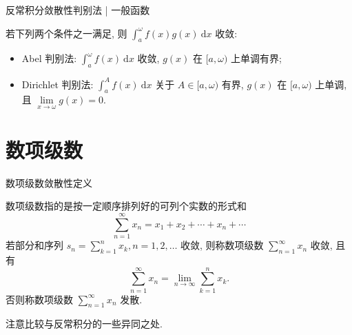 
\begin{frame}{反常积分敛散性判别法 | {\smaller[1] 一般函数}}

\begin{thm}[A-D 判别法]
若下列两个条件之一满足, 则 $\int_a^\omega f(x)g(x) ~ \mathrm{d} x$ 收敛:
\pause
\begin{itemize}[<+->]
\item Abel 判别法: $\int_a^\omega f(x) ~ \mathrm{d} x$ 收敛, $g(x)$ 在 $[a, \omega)$ 上单调有界;
\item Dirichlet 判别法: $\int_a^A f(x) ~ \mathrm{d} x$ 关于 $A \in [a, \omega)$ 有界, $g(x)$ 在 $[a, \omega)$ 上单调, 且 $\lim\limits_{x \to \omega} g(x) = 0.$
\end{itemize}
\end{thm}

\end{frame}


\section{数项级数}


\begin{frame}{数项级数敛散性定义}

\begin{Def}
数项级数指的是{\color{red}按一定顺序排列好}的可列个实数的形式和
\[\sum\limits_{n=1}^\infty x_n = x_1 + x_2 + \cdots + x_n + \cdots\]
\pause
若部分和序列 $s_n = \sum\limits_{k=1}^n x_k, n = 1, 2, \dots$ 收敛, 则称数项级数 $\sum\limits_{n=1}^\infty x_n$ 收敛, 且有
\[\sum\limits_{n=1}^\infty x_n = \lim\limits_{n\to\infty} \sum\limits_{k=1}^n x_k.\]
否则称数项级数 $\sum\limits_{n=1}^\infty x_n$ 发散.
\end{Def}

\pause

注意比较与反常积分的一些异同之处.

\end{frame}


